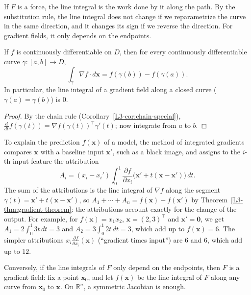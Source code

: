 If $F$ is a force, the line integral is the work done by it along the path. By the substitution rule, the line integral does not change if we reparametrize the curve in the same direction, and it changes its sign if we reverse the direction. For gradient fields, it only depends on the endpoints.

\begin{theorem}\label{L3-thm:gradient-theorem}
    If $f$ is continuously differentiable on $D$, then for every continuously differentiable curve $\gamma: [a, b] \to D$,
    \[\int_\gamma \nabla f \cdot d\mathbf{x} = f(\gamma(b)) - f(\gamma(a)).\]
    In particular, the line integral of a gradient field along a closed curve ($\gamma(a) = \gamma(b)$) is $0$.
\end{theorem}

\begin{proof}
    By the chain rule (Corollary~\ref{L3-cor:chain-special}), $\frac{d}{dt}f(\gamma(t)) = \nabla f(\gamma(t))^\top\gamma'(t)$; now integrate from $a$ to $b$.
\end{proof}

\begin{example}\label{L3-ex:integrated-gradients}
    To explain the prediction $f(\mathbf{x})$ of a model, the method of integrated gradients compares $\mathbf{x}$ with a baseline input $\mathbf{x}'$, such as a black image, and assigns to the $i$-th input feature the attribution
    \[A_i = (x_i - x_i')\int_0^1 \frac{\partial f}{\partial x_i}\big(\mathbf{x}' + t(\mathbf{x} - \mathbf{x}')\big)\, dt.\]
    The sum of the attributions is the line integral of $\nabla f$ along the segment $\gamma(t) = \mathbf{x}' + t(\mathbf{x} - \mathbf{x}')$, so $A_1 + \cdots + A_n = f(\mathbf{x}) - f(\mathbf{x}')$ by Theorem~\ref{L3-thm:gradient-theorem}: the attributions account exactly for the change of the output. For example, for $f(\mathbf{x}) = x_1x_2$, $\mathbf{x} = (2, 3)^\top$ and $\mathbf{x}' = \mathbf{0}$, we get $A_1 = 2\int_0^1 3t\, dt = 3$ and $A_2 = 3\int_0^1 2t\, dt = 3$, which add up to $f(\mathbf{x}) = 6$. The simpler attributions $x_i\frac{\partial f}{\partial x_i}(\mathbf{x})$ (``gradient times input'') are $6$ and $6$, which add up to $12$.
\end{example}

Conversely, if the line integrals of $F$ only depend on the endpoints, then $F$ is a gradient field: fix a point $\mathbf{x}_0$, and let $f(\mathbf{x})$ be the line integral of $F$ along any curve from $\mathbf{x}_0$ to $\mathbf{x}$. On $\mathbb{R}^n$, a symmetric Jacobian is enough.

